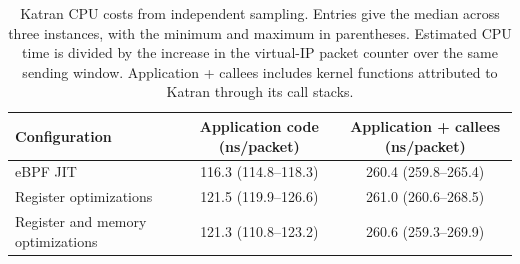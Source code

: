\begin{table}[t]
\centering
\small
\caption{Katran CPU costs from independent sampling. Entries give the median across three instances, with the minimum and maximum in parentheses. Estimated CPU time is divided by the increase in the virtual-IP packet counter over the same sending window. Application + callees includes kernel functions attributed to Katran through its call stacks.}
\label{tab:eval-katran-profile}
\setlength{\tabcolsep}{3pt}
\renewcommand{\arraystretch}{1.08}
\begin{tabular*}{\textwidth}{@{\extracolsep{\fill}}lcc@{}}
\toprule
\textbf{Configuration} & \textbf{Application code (ns/packet)} & \textbf{Application + callees (ns/packet)} \\
\midrule
eBPF JIT & 116.3 (114.8--118.3) & 260.4 (259.8--265.4) \\
Register optimizations & 121.5 (119.9--126.6) & 261.0 (260.6--268.5) \\
Register and memory optimizations & 121.3 (110.8--123.2) & 260.6 (259.3--269.9) \\
\bottomrule
\end{tabular*}
\end{table}

